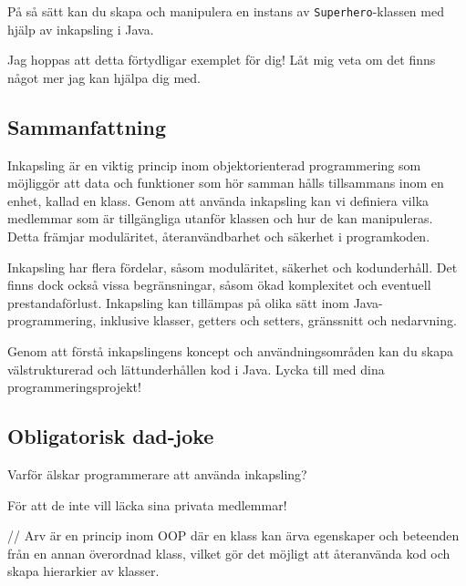 På så sätt kan du skapa och manipulera en instans av
\texttt{Superhero}-klassen med hjälp av inkapsling i Java.

Jag hoppas att detta förtydligar exemplet för dig! Låt mig veta om det
finns något mer jag kan hjälpa dig med.

\hypertarget{sammanfattning}{%
\subsection{Sammanfattning}\label{sammanfattning}}

Inkapsling är en viktig princip inom objektorienterad programmering som
möjliggör att data och funktioner som hör samman hålls tillsammans inom
en enhet, kallad en klass. Genom att använda inkapsling kan vi definiera
vilka medlemmar som är tillgängliga utanför klassen och hur de kan
manipuleras. Detta främjar moduläritet, återanvändbarhet och säkerhet i
programkoden.

Inkapsling har flera fördelar, såsom moduläritet, säkerhet och
kodunderhåll. Det finns dock också vissa begränsningar, såsom ökad
komplexitet och eventuell prestandaförlust. Inkapsling kan tillämpas på
olika sätt inom Java-programmering, inklusive klasser, getters och
setters, gränssnitt och nedarvning.

Genom att förstå inkapslingens koncept och användningsområden kan du
skapa välstrukturerad och lättunderhållen kod i Java. Lycka till med
dina programmeringsprojekt!

\hypertarget{obligatorisk-dad-joke}{%
\subsection{Obligatorisk dad-joke}\label{obligatorisk-dad-joke}}

Varför älskar programmerare att använda inkapsling?

För att de inte vill läcka sina privata medlemmar!

// Arv är en princip inom OOP där en klass kan ärva egenskaper och
beteenden från en annan överordnad klass, vilket gör det möjligt att
återanvända kod och skapa hierarkier av klasser.

